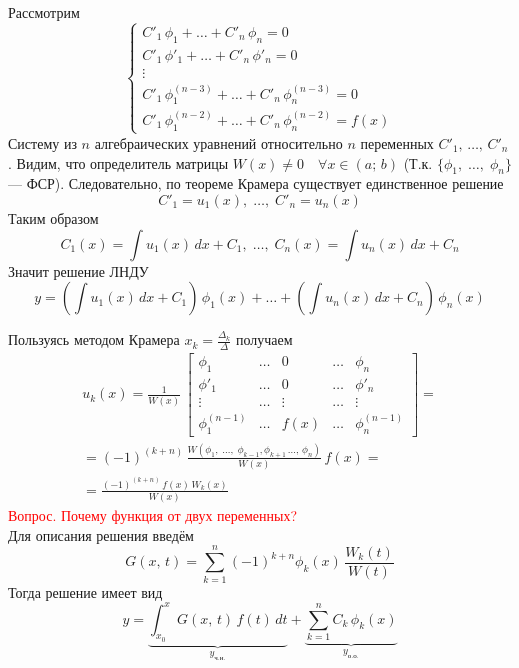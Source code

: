 \begin{Proof}
    Рассмотрим
    \[
        \begin{cases}
            C'_1\,\phi_1 + \dots + C'_n\,\phi_n = 0\\
            C'_1\,\phi'_1 + \dots + C'_n\,\phi'_n = 0\\
            \vdots\\
            C'_1\,\phi^{(n-3)}_1 + \dots + C'_n\,\phi^{(n-3)}_n = 0\\
            C'_1\,\phi^{(n-2)}_1 + \dots + C'_n\,\phi^{(n-2)}_n = f(x)
        \end{cases}
    \]
    Систему из $n$ алгебраических уравнений относительно $n$ переменных $C'_1,\, \dots,\, C'_n$. Видим, что определитель матрицы $W(x) \neq 0 \quad \forall x \in (a;\,b)$ (Т.к. $\{\phi_1,\; \dots,\; \phi_n\}$ --- ФСР). Следовательно, по теореме Крамера существует единственное решение
    \[
        C'_1 = u_1(x),\; \dots,\; C'_n = u_n(x)
    \]
    Таким образом
    \[
        C_1(x) = \int u_1(x)\,dx + C_1,\; \dots,\; C_n(x) = \int u_n(x)\,dx + C_n
    \]
    Значит решение ЛНДУ
    \[
        y = \left(\int u_1(x)\,dx + C_1\right)\,\phi_1(x) + \dots + \left(\int u_n(x)\,dx + C_n\right)\,\phi_n(x)
    \]
\end{Proof}

\begin{Note}
    Пользуясь методом Крамера $x_k = \frac{\Delta_k}{\Delta}$ получаем
    \begin{gather*}
        u_k(x) = \frac{1}{W(x)} \, 
        \begin{bmatrix}
            \phi_1 & \dots & 0 & \dots & \phi_n\\
            \phi'_1 & \dots & 0 & \dots & \phi'_n\\
            \vdots & \dots & \vdots & \dots & \vdots\\
            \phi^{(n-1)}_1 & \dots & f(x) & \dots & \phi^{(n-1)}_n
        \end{bmatrix} = \\
        = (-1)^{(k+n)}\, \frac{W(\phi_1,\; \dots,\; \phi_{k - 1}, \phi_{k + 1}\, \dots,\, \phi_n)}{W(x)}\,f(x) = \\
        = \frac{(-1)^{(k+n)}\, f(x)\, W_k(x)}{W(x)}
    \end{gather*}
    \textcolor{red}{Вопрос. Почему функция от двух переменных?}\\
    Для описания решения введём
    \[
        G(x,\, t) = \sum_{k=1}^{n} (-1)^{k + n} \phi_k(x)\, \frac{W_k(t)}{W(t)}
    \]
    Тогда решение имеет вид
    \[
        y = \underbrace{\int_{x_0}^{x}G(x,\,t)\, f(t)\, dt}_{y_\text{ч.н.}} + \underbrace{\sum_{k=1}^{n} C_k\, \phi_k(x)}_{y_\text{о.о.}}
    \]
\end{Note}


